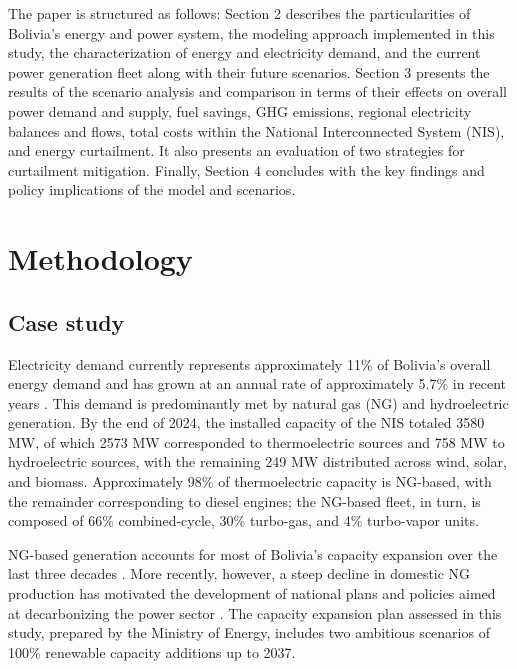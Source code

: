 \documentclass[a4paper,fleqn]{cas-dc}
\begin{document}
The paper is structured as follows: Section 2 describes the particularities of Bolivia's energy and power system, the modeling approach implemented in this study, the characterization of energy and electricity demand, and the current power generation fleet along with their future scenarios. Section 3 presents the results of the scenario analysis and comparison in terms of their effects on overall power demand and supply, fuel savings, GHG emissions, regional electricity balances and flows, total costs within the National Interconnected System (NIS), and energy curtailment. It also presents an evaluation of two strategies for curtailment mitigation. Finally, Section 4 concludes with the key findings and policy implications of the model and scenarios.

\section{Methodology}
\subsection{Case study}
Electricity demand currently represents approximately 11\% of Bolivia's overall energy demand and has grown at an annual rate of approximately 5.7\% in recent years \cite{MHE2023BED, MHE2024BEN}. This demand is predominantly met by natural gas (NG) and hydroelectric generation. By the end of 2024, the installed capacity of the NIS totaled 3580 MW, of which 2573 MW corresponded to thermoelectric sources and 758 MW to hydroelectric sources, with the remaining 249 MW distributed across wind, solar, and biomass. Approximately 98\% of thermoelectric capacity is NG-based, with the remainder corresponding to diesel engines; the NG-based fleet, in turn, is composed of 66\% combined-cycle, 30\% turbo-gas, and 4\% turbo-vapor units.

NG-based generation accounts for most of Bolivia's capacity expansion over the last three decades \cite{ballivian2024embracing}. More recently, however, a steep decline in domestic NG production \cite{MHE2024BEN} has motivated the development of national plans and policies aimed at decarbonizing the power sector \cite{balderrama2017techno, fernandez2022energy}. The capacity expansion plan assessed in this study, prepared by the Ministry of Energy, includes two ambitious scenarios of 100\% renewable capacity additions up to 2037.
\end{document}
